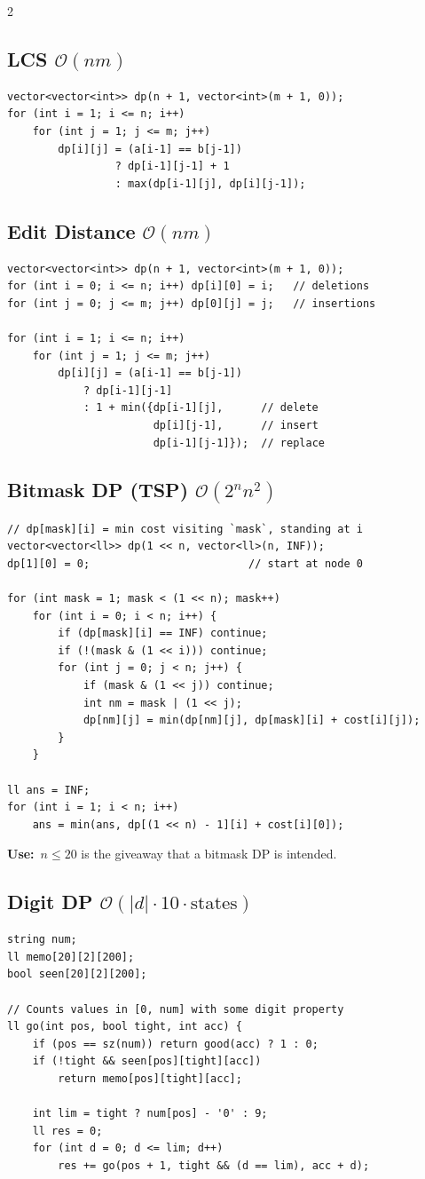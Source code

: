 \documentclass[10pt]{article}
\newcommand{\sub}[2]{\subsection[#1]{#1\hspace{0.6em}%
  \textnormal{\color{accent2}\small$\mathcal{O}(#2)$}}}
\newcommand{\uses}[1]{{\color{accent2}\footnotesize\textbf{Use:}}~{\footnotesize #1}\par}
\begin{document}
\begin{multicols}{2}
\sub{LCS}{nm}
\begin{lstlisting}
vector<vector<int>> dp(n + 1, vector<int>(m + 1, 0));
for (int i = 1; i <= n; i++)
    for (int j = 1; j <= m; j++)
        dp[i][j] = (a[i-1] == b[j-1])
                 ? dp[i-1][j-1] + 1
                 : max(dp[i-1][j], dp[i][j-1]);
\end{lstlisting}

\sub{Edit Distance}{nm}
\begin{lstlisting}
vector<vector<int>> dp(n + 1, vector<int>(m + 1, 0));
for (int i = 0; i <= n; i++) dp[i][0] = i;   // deletions
for (int j = 0; j <= m; j++) dp[0][j] = j;   // insertions

for (int i = 1; i <= n; i++)
    for (int j = 1; j <= m; j++)
        dp[i][j] = (a[i-1] == b[j-1])
            ? dp[i-1][j-1]
            : 1 + min({dp[i-1][j],      // delete
                       dp[i][j-1],      // insert
                       dp[i-1][j-1]});  // replace
\end{lstlisting}

\sub{Bitmask DP (TSP)}{2^n n^2}
\begin{lstlisting}
// dp[mask][i] = min cost visiting `mask`, standing at i
vector<vector<ll>> dp(1 << n, vector<ll>(n, INF));
dp[1][0] = 0;                         // start at node 0

for (int mask = 1; mask < (1 << n); mask++)
    for (int i = 0; i < n; i++) {
        if (dp[mask][i] == INF) continue;
        if (!(mask & (1 << i))) continue;
        for (int j = 0; j < n; j++) {
            if (mask & (1 << j)) continue;
            int nm = mask | (1 << j);
            dp[nm][j] = min(dp[nm][j], dp[mask][i] + cost[i][j]);
        }
    }

ll ans = INF;
for (int i = 1; i < n; i++)
    ans = min(ans, dp[(1 << n) - 1][i] + cost[i][0]);
\end{lstlisting}
\uses{$n \le 20$ is the giveaway that a bitmask DP is intended.}

\sub{Digit DP}{|d| \cdot 10 \cdot \text{states}}
\begin{lstlisting}
string num;
ll memo[20][2][200];
bool seen[20][2][200];

// Counts values in [0, num] with some digit property
ll go(int pos, bool tight, int acc) {
    if (pos == sz(num)) return good(acc) ? 1 : 0;
    if (!tight && seen[pos][tight][acc])
        return memo[pos][tight][acc];

    int lim = tight ? num[pos] - '0' : 9;
    ll res = 0;
    for (int d = 0; d <= lim; d++)
        res += go(pos + 1, tight && (d == lim), acc + d);


\end{lstlisting}
\end{multicols}
\end{document}

